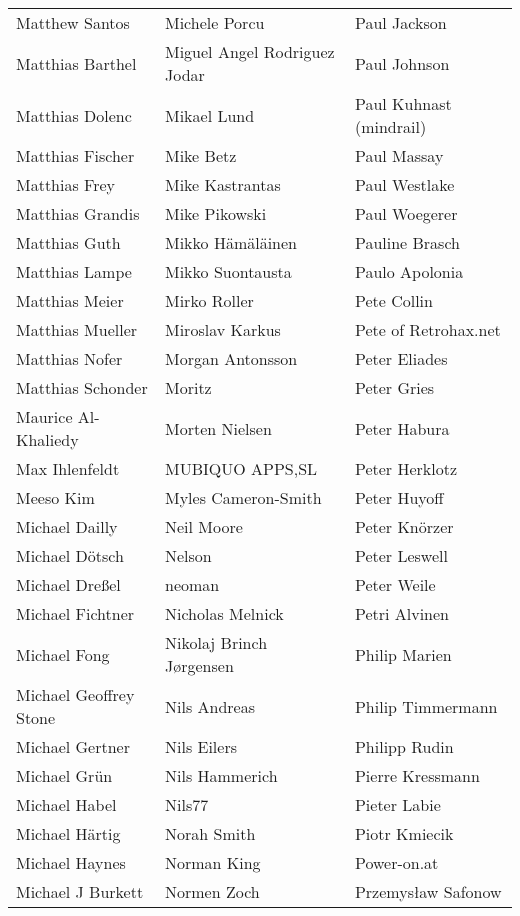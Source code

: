 \begin{small}
\begin{tabular}{p{4cm}p{4cm}p{4cm}}
\end{tabular}
\newpage
\setlength{\tabcolsep}{1mm}
\begin{tabular}{p{4cm}p{4cm}p{4cm}}
Matthew Santos & Michele Porcu & Paul Jackson \\
Matthias Barthel & Miguel Angel Rodriguez Jodar & Paul Johnson \\
Matthias Dolenc & Mikael Lund & Paul Kuhnast (mindrail) \\
Matthias Fischer & Mike Betz & Paul Massay \\
Matthias Frey & Mike Kastrantas & Paul Westlake \\
Matthias Grandis & Mike Pikowski & Paul Woegerer \\
Matthias Guth & Mikko Hämäläinen & Pauline Brasch \\
Matthias Lampe & Mikko Suontausta & Paulo Apolonia \\
Matthias Meier & Mirko Roller & Pete Collin \\
Matthias Mueller & Miroslav Karkus & Pete of Retrohax.net \\
Matthias Nofer & Morgan Antonsson & Peter Eliades \\
Matthias Schonder & Moritz & Peter Gries \\
Maurice Al-Khaliedy & Morten Nielsen & Peter Habura \\
Max Ihlenfeldt & MUBIQUO APPS,SL & Peter Herklotz \\
Meeso Kim & Myles Cameron-Smith & Peter Huyoff \\
Michael Dailly & Neil Moore & Peter Knörzer \\
Michael Dötsch & Nelson & Peter Leswell \\
Michael Dreßel & neoman & Peter Weile \\
Michael Fichtner & Nicholas Melnick & Petri Alvinen \\
Michael Fong & Nikolaj Brinch Jørgensen & Philip Marien \\
Michael Geoffrey Stone & Nils Andreas & Philip Timmermann \\
Michael Gertner & Nils Eilers & Philipp Rudin \\
Michael Grün & Nils Hammerich & Pierre Kressmann \\
Michael Habel & Nils77 & Pieter Labie \\
Michael Härtig & Norah Smith & Piotr Kmiecik \\
Michael Haynes & Norman King & Power-on.at \\
Michael J Burkett & Normen Zoch & Przemysław Safonow \\

\end{tabular}
\end{small}
